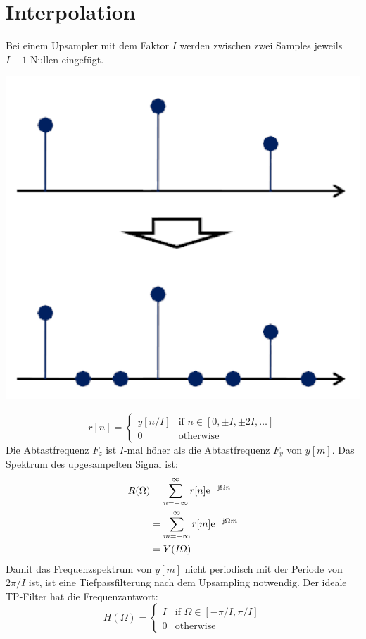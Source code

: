 \section{Interpolation}
Bei einem Upsampler mit dem Faktor $I$ werden zwischen zwei Samples jeweils
$I-1$ Nullen eingefügt.
\begin{center}
	\includegraphics[scale=.7]{./images/upsample}
\end{center}
\[ r[n] = \left\lbrace \begin{matrix}
	y[n/I] & \textrm{if } n \in [0,\pm I, \pm 2I,\ldots]\\
	0 & \textrm{otherwise}
\end{matrix} \right. \] 
Die Abtastfrequenz $F_z$ ist $I$-mal höher als die Abtastfrequenz $F_y$ von
$y[m]$. Das Spektrum des upgesampelten Signal ist:
\[ \begin{aligned} R(\Omega) &= \sum_{n=-\infty}^{\infty} r[n]
	\e^{-\im\Omega n} \\
	&= \sum_{m=-\infty}^{\infty} r[m]\e^{-\im\Omega m}\\
	&= Y(I\Omega)  \end{aligned} \]
Damit das Frequenzspektrum von $y[m]$ nicht periodisch mit der Periode
von $2\pi/I$ ist, ist eine Tiefpassfilterung nach dem Upsampling notwendig. Der
ideale TP-Filter hat die Frequenzantwort:
\[ H(\Omega) = \left\lbrace \begin{matrix}
	I & \textrm{if } \Omega \in [-\pi/I,\pi/I]\\
	0 & \textrm{otherwise}
	\end{matrix} \right. \]
